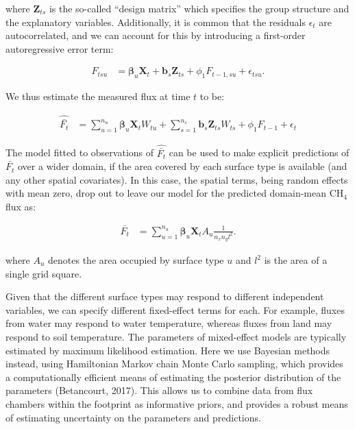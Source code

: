 where \(\mathbf{Z}_{ts}\) is the so-called ``design matrix'' which
specifies the group structure and the explanatory variables.
Additionally, it is common that the residuals \(\epsilon_{t}\) are
autocorrelated, and we can account for this by introducing a first-order
autoregressive error term:

\begin{align}
   \label{eq:lmerModel_ar_ust} 
  F_{tsu} &= \boldsymbol{\beta}_u \mathbf{X}_t + \mathbf{b}_s \mathbf{Z}_{ts} + \phi_{1}F_{t-1,su} + \epsilon_{tsu}.

\end{align}

We thus estimate the measured flux at time \(t\) to be:

\begin{align}
   \label{eq:pred_Fbarhat} 
  \widehat{\bar{F_t}} &= \sum_{u = 1}^{n_u} \boldsymbol{\beta}_u \mathbf{X}_t W_{tu} 
                       + \sum_{s = 1}^{n_s} \mathbf{b}_s \mathbf{Z}_{ts} W_{ts} 
                       + \phi_{1}F_{t-1} + \epsilon_{t}  

\end{align}

The model fitted to observations of \(\widehat{\bar{F_t}}\) can be used
to make explicit predictions of \(\bar{F_t}\) over a wider domain, if
the area covered by each surface type is available (and any other
spatial covariates). In this case, the spatial terms, being random
effects with mean zero, drop out to leave our model for the predicted
domain-mean CH\(_4\) flux as:

\begin{align}
   \label{eq:pred_Fbar} 
  \bar{F_t} &= \sum_{u = 1}^{n_u} \boldsymbol{\beta}_u \mathbf{X}_t A_{u} \frac{1}{n_x n_y l^2}.

\end{align}

where \(A_{u}\) denotes the area occupied by surface type \(u\) and
\(l^2\) is the area of a single grid square.

Given that the different surface types may respond to different
independent variables, we can specify different fixed-effect terms for
each. For example, fluxes from water may respond to water temperature,
whereas fluxes from land may respond to soil temperature. The parameters
of mixed-effect models are typically estimated by maximum likelihood
estimation. Here we use Bayesian methods instead, using Hamiltonian
Markov chain Monte Carlo sampling, which provides a computationally
efficient means of estimating the posterior distribution of the
parameters (Betancourt, 2017). This allows us to combine data from flux
chambers within the footprint as informative priors, and provides a
robust means of estimating uncertainty on the parameters and
predictions.

